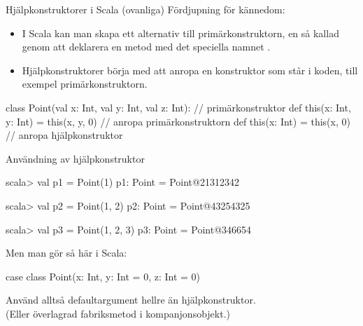 \begin{Slide}{Hjälpkonstruktorer i Scala (ovanliga)}%
Fördjupning för kännedom:
\begin{itemize}
\item I Scala kan man skapa ett alternativ till primärkonstruktorn, en så kallad   genom att deklarera en metod med det speciella namnet .


\item Hjälpkonstruktorer  börja med att anropa en  konstruktor som står  i koden, till exempel primärkonstruktorn.
\end{itemize}

\begin{Code}
class Point(val x: Int, val y: Int, val z: Int): // primärkonstruktor
  def this(x: Int, y: Int) = this(x, y, 0) // anropa primärkonstruktorn
  def this(x: Int) = this(x, 0) // anropa hjälpkonstruktor
\end{Code}


\end{Slide}

\begin{Slide}{Användning av hjälpkonstruktor}
\begin{REPL}
scala> val p1 = Point(1)
p1: Point = Point@21312342

scala> val p2 = Point(1, 2)
p2: Point = Point@43254325

scala> val p3 = Point(1, 2, 3)
p3: Point = Point@346654
\end{REPL}
\pause
Men man gör  så här i Scala:
\begin{Code}[basicstyle=\ttfamily\SlideFontSize{8.5}{12}]
case class Point(x: Int, y: Int = 0, z: Int = 0)
\end{Code}
Använd alltså defaultargument hellre än hjälpkonstruktor.\\
(Eller överlagrad fabriksmetod i kompanjonsobjekt.)
\end{Slide}



